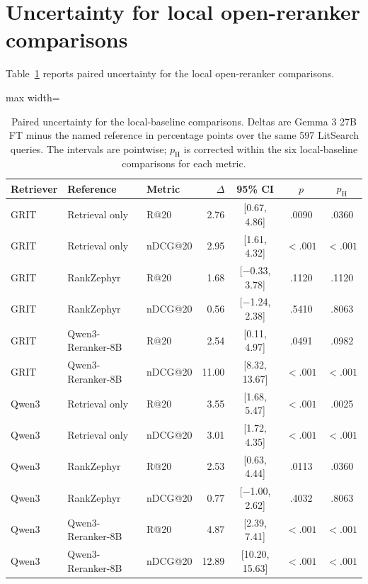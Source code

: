 \documentclass[pdflatex,sn-basic,Numbered]{sn-jnl}%
\theoremstyle{thmstyleone}%
\theoremstyle{thmstyletwo}%
\theoremstyle{thmstylethree}%
\begin{document}
\FloatBarrier
\section{Uncertainty for local open-reranker comparisons}
\label{supp:local}

Table~\ref{tab:open-reranker-uncertainty} reports paired uncertainty for the local open-reranker comparisons.

\begin{table}[t]


\centering
\scriptsize
\setlength{\tabcolsep}{4pt}
\renewcommand{\arraystretch}{0.98}
\begin{adjustbox}{max width=\linewidth}
\begin{tabular}{l l l r c c c}
\hline
Retriever & Reference & Metric & $\Delta$ & 95\% CI & $p$ & $p_{\mathrm{H}}$ \\
\hline
GRIT & Retrieval only & R@20 & 2.76 & [0.67, 4.86] & .0090 & .0360 \\
GRIT & Retrieval only & nDCG@20 & 2.95 & [1.61, 4.32] & $<.001$ & $<.001$ \\
GRIT & RankZephyr & R@20 & 1.68 & [$-$0.33, 3.78] & .1120 & .1120 \\
GRIT & RankZephyr & nDCG@20 & 0.56 & [$-$1.24, 2.38] & .5410 & .8063 \\
GRIT & Qwen3-Reranker-8B & R@20 & 2.54 & [0.11, 4.97] & .0491 & .0982 \\
GRIT & Qwen3-Reranker-8B & nDCG@20 & 11.00 & [8.32, 13.67] & $<.001$ & $<.001$ \\
\hline
Qwen3 & Retrieval only & R@20 & 3.55 & [1.68, 5.47] & $<.001$ & .0025 \\
Qwen3 & Retrieval only & nDCG@20 & 3.01 & [1.72, 4.35] & $<.001$ & $<.001$ \\
Qwen3 & RankZephyr & R@20 & 2.53 & [0.63, 4.44] & .0113 & .0360 \\
Qwen3 & RankZephyr & nDCG@20 & 0.77 & [$-$1.00, 2.62] & .4032 & .8063 \\
Qwen3 & Qwen3-Reranker-8B & R@20 & 4.87 & [2.39, 7.41] & $<.001$ & $<.001$ \\
Qwen3 & Qwen3-Reranker-8B & nDCG@20 & 12.89 & [10.20, 15.63] & $<.001$ & $<.001$ \\
\hline
\end{tabular}
\end{adjustbox}


\caption{Paired uncertainty for the local-baseline comparisons. Deltas are Gemma
3 27B FT minus the named reference in percentage points over the same 597
LitSearch queries. The intervals are pointwise; $p_{\mathrm{H}}$ is corrected
within the six local-baseline comparisons for each metric.}
\label{tab:open-reranker-uncertainty}
\end{table}
\end{document}
